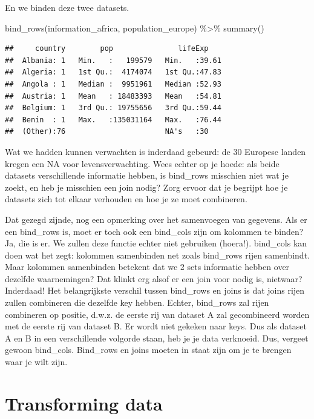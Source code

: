 \documentclass[]{tufte-book}
\newenvironment{Shaded}{}{}
\newcommand{\FunctionTok}[1]{\textcolor[rgb]{0.02,0.16,0.49}{#1}}
\newcommand{\NormalTok}[1]{#1}
\newcommand{\SpecialCharTok}[1]{\textcolor[rgb]{0.25,0.44,0.63}{#1}}
\begin{document}
En we binden deze twee datasets.

\begin{Shaded}
\begin{Highlighting}[]
\FunctionTok{bind\_rows}\NormalTok{(information\_africa, population\_europe) }\SpecialCharTok{\%\textgreater{}\%}
  \FunctionTok{summary}\NormalTok{()}
\end{Highlighting}
\end{Shaded}

\begin{verbatim}
##     country        pop               lifeExp     
##  Albania: 1   Min.   :   199579   Min.   :39.61  
##  Algeria: 1   1st Qu.:  4174074   1st Qu.:47.83  
##  Angola : 1   Median :  9951961   Median :52.93  
##  Austria: 1   Mean   : 18483393   Mean   :54.81  
##  Belgium: 1   3rd Qu.: 19755656   3rd Qu.:59.44  
##  Benin  : 1   Max.   :135031164   Max.   :76.44  
##  (Other):76                       NA's   :30
\end{verbatim}

Wat we hadden kunnen verwachten is inderdaad gebeurd: de 30 Europese landen kregen een NA voor levensverwachting. Wees echter op je hoede: als beide datasets verschillende informatie hebben, is bind\_rows misschien niet wat je zoekt, en heb je misschien een join nodig? Zorg ervoor dat je begrijpt hoe je datasets zich tot elkaar verhouden en hoe je ze moet combineren.

Dat gezegd zijnde, nog een opmerking over het samenvoegen van gegevens. Als er een bind\_rows is, moet er toch ook een bind\_cols zijn om kolommen te binden? Ja, die is er. We zullen deze functie echter niet gebruiken (hoera!). bind\_cols kan doen wat het zegt: kolommen samenbinden net zoals bind\_rows rijen samenbindt. Maar kolommen samenbinden betekent dat we 2 sets informatie hebben over dezelfde waarnemingen? Dat klinkt erg alsof er een join voor nodig is, nietwaar? Inderdaad! Het belangrijkste verschil tussen bind\_rows en joins is dat joins rijen zullen combineren die dezelfde key hebben. Echter, bind\_rows zal rijen combineren op positie, d.w.z. de eerste rij van dataset A zal gecombineerd worden met de eerste rij van dataset B. Er wordt niet gekeken naar keys. Dus als dataset A en B in een verschillende volgorde staan, heb je je data verknoeid. Dus, vergeet gewoon bind\_cols. Bind\_rows en joins moeten in staat zijn om je te brengen waar je wilt zijn.

\hypertarget{transforming-data}{%
\section{Transforming data}\label{transforming-data}}
\end{document}
